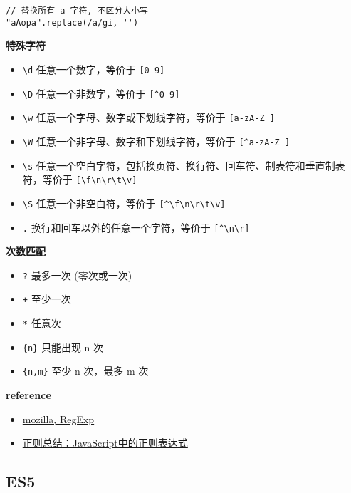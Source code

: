 \begin{lstlisting}
// 替换所有 a 字符, 不区分大小写
"aAopa".replace(/a/gi, '')
\end{lstlisting}

\textbf{特殊字符}

\begin{itemize}
\tightlist
\item
  \lstinline!\d! 任意一个数字，等价于 \lstinline![0-9]!
\item
  \lstinline!\D! 任意一个非数字，等价于 \lstinline![^0-9]!
\item
  \lstinline!\w! 任意一个字母、数字或下划线字符，等价于
  \lstinline![a-zA-Z_]!
\item
  \lstinline!\W! 任意一个非字母、数字和下划线字符，等价于
  \lstinline![^a-zA-Z_]!
\item
  \lstinline!\s!
  任意一个空白字符，包括换页符、换行符、回车符、制表符和垂直制表符，等价于
  \lstinline![\f\n\r\t\v]!
\item
  \lstinline!\S! 任意一个非空白符，等价于 \lstinline![^\f\n\r\t\v]!
\item
  \lstinline!.! 换行和回车以外的任意一个字符，等价于 \lstinline![^\n\r]!
\end{itemize}

\textbf{次数匹配}

\begin{itemize}
\tightlist
\item
  \lstinline!?! 最多一次 (零次或一次)
\item
  \lstinline!+! 至少一次
\item
  \lstinline!*! 任意次
\item
  \lstinline!{n}! 只能出现 n 次
\item
  \lstinline!{n,m}! 至少 n 次，最多 m 次
\end{itemize}

\textbf{reference}

\begin{itemize}
\tightlist
\item
  \href{https://developer.mozilla.org/zh-CN/docs/Web/JavaScript/Reference/Global_Objects/RegExp}{mozilla,
  RegExp}
\item
  \href{http://www.nowamagic.net/librarys/veda/detail/1283}{正则总结：JavaScript中的正则表达式}
\end{itemize}

\subsection{ES5}\label{es5}

